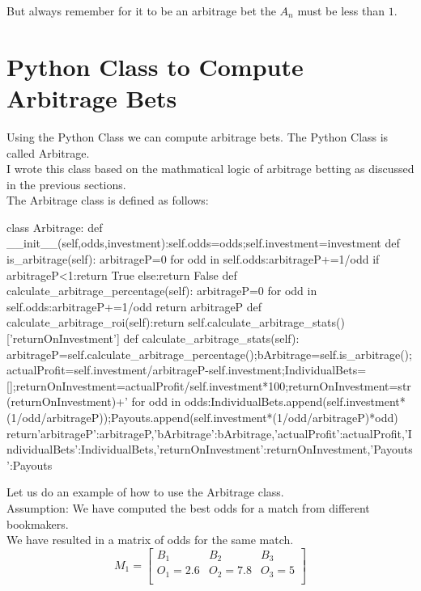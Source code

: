 But always remember for it to be an arbitrage bet the $A_{n}$ must be less than $1$.

\newpage
\section{Python Class to Compute Arbitrage Bets}

Using the Python Class we can compute arbitrage bets. The Python Class is called Arbitrage. \\
I wrote this class based on the mathmatical logic of arbitrage betting as discussed in the previous sections.\\

The Arbitrage class is defined as follows:

\begin{python}
class Arbitrage:
	def __init__(self,odds,investment):self.odds=odds;self.investment=investment
	def is_arbitrage(self):
		arbitrageP=0
		for odd in self.odds:arbitrageP+=1/odd
		if arbitrageP<1:return True
		else:return False
	def calculate_arbitrage_percentage(self):
		arbitrageP=0
		for odd in self.odds:arbitrageP+=1/odd
		return arbitrageP
	def calculate_arbitrage_roi(self):return self.calculate_arbitrage_stats()['returnOnInvestment']
	def calculate_arbitrage_stats(self):
		arbitrageP=self.calculate_arbitrage_percentage();bArbitrage=self.is_arbitrage();actualProfit=self.investment/arbitrageP-self.investment;IndividualBets=[];returnOnInvestment=actualProfit/self.investment*100;returnOnInvestment=str(returnOnInvestment)+'%
		for odd in odds:IndividualBets.append(self.investment*(1/odd/arbitrageP));Payouts.append(self.investment*(1/odd/arbitrageP)*odd)
		return{'arbitrageP':arbitrageP,'bArbitrage':bArbitrage,'actualProfit':actualProfit,'IndividualBets':IndividualBets,'returnOnInvestment':returnOnInvestment,'Payouts':Payouts}
\end{python}

Let us do an example of how to use the Arbitrage class.\\

Assumption: We have computed the best odds for a match from different bookmakers.\\

We have resulted in a matrix of odds for the same match.\\

\begin{equation}
    M_{1} = 
    \begin{bmatrix}
        B_{1} & B_{2} & B_{3} \\
        O_{1} = 2.6 & O_{2} = 7.8 & O_{3} = 5 \\ 
    \end{bmatrix}    
\end{equation}

